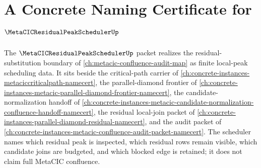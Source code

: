 \chapter{A Concrete Naming Certificate for $\MetaCICResidualPeakSchedulerUp$}
\label{ch:concrete-instances-metacic-residual-peak-scheduler-namecert}

The $\MetaCICResidualPeakSchedulerUp$ packet realizes the residual-substitution boundary of \autoref{ch:metacic-confluence-audit-map} as finite local-peak scheduling data. It sits beside the critical-path carrier of \autoref{ch:concrete-instances-metaciccriticalpath-namecert}, the parallel-diamond frontier of \autoref{ch:concrete-instances-metacic-parallel-diamond-frontier-namecert}, the candidate-normalization handoff of \autoref{ch:concrete-instances-metacic-candidate-normalization-confluence-handoff-namecert}, the residual local-join packet of \autoref{ch:concrete-instances-parallel-diamond-residual-namecert}, and the audit packet of \autoref{ch:concrete-instances-metacic-confluence-audit-packet-namecert}. The scheduler names which residual peak is inspected, which residual rows remain visible, which candidate joins are budgeted, and which blocked edge is retained; it does not claim full MetaCIC confluence.

